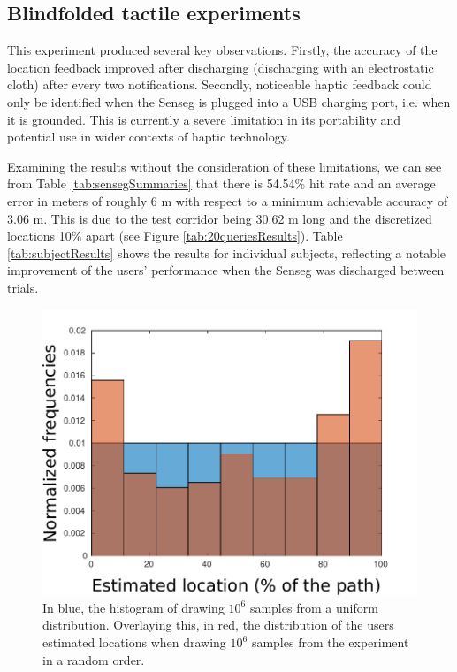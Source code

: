 \subsection{Blindfolded tactile experiments}

This experiment produced several key observations.  Firstly, the accuracy of the location feedback improved after discharging (discharging with an electrostatic cloth) after every two notifications. Secondly, noticeable haptic feedback could only be identified when the Senseg is plugged into a USB charging port, i.e. when it is grounded. This is currently a severe limitation in its portability and potential use in wider contexts of haptic technology.

  
Examining the results without the consideration of these limitations, we can see from Table \ref{tab:sensegSummaries} that there is 54.54\% hit rate and an average error in meters of roughly 6 m with respect to a minimum achievable accuracy of 3.06 m. This is due to the test corridor being 30.62 m long and the discretized locations 10\% apart (see Figure \ref{tab:20queriesResults}). Table \ref{tab:subjectResults} shows the results for individual subjects, reflecting a notable improvement of the users' performance when the Senseg was discharged between trials.

\begin{figure}[h]
    \centering
    \includegraphics[width=.7\textwidth]{gfx/Chapter06/barplot_rand.pdf}%
    \caption{In blue, the histogram of drawing $10^6$ samples from a uniform distribution. Overlaying this, in red, the distribution of the users estimated locations when drawing $10^6$ samples from the experiment in a random order.}   
\end{figure}



